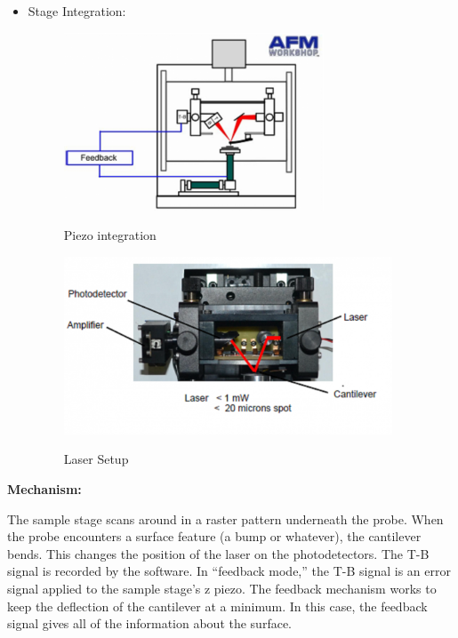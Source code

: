 \documentclass{../lab}
\begin{document}
\begin{itemize}
    \item Stage Integration:
    
    \begin{figure}[H]
    \centering
      \href{http://experimentationlab.berkeley.edu/sites/default/files/AFMImages/AFMdiagram.png}{\includegraphics[height=150pt,keepaspectratio]{images/AFMdiagram.png}}
      \caption{Piezo integration}
      \label{fig:PiezoIntegration}
    \endminipage\hfill
    \centering
      \href{http://experimentationlab.berkeley.edu/sites/default/files/AFMImages/AFMstage2.PNG}{\includegraphics[height=150pt,keepaspectratio]{images/AFMstage2.PNG}}
      \caption{Laser Setup}
        \label{fig:LaserSertup}
    \endminipage
    \end{figure}

\end{itemize}

\textbf{Mechanism:}

The sample stage scans around in a raster pattern underneath the probe. When the probe encounters a surface feature (a bump or whatever), the cantilever bends. This changes the position of the laser on the photodetectors. The T-B signal is recorded by the software. In ``feedback mode,'' the T-B signal is an error signal applied to the sample stage's z piezo. The feedback mechanism works to keep the deflection of the cantilever at a minimum. In this case, the feedback signal gives all of the information about the surface.
\end{document}
